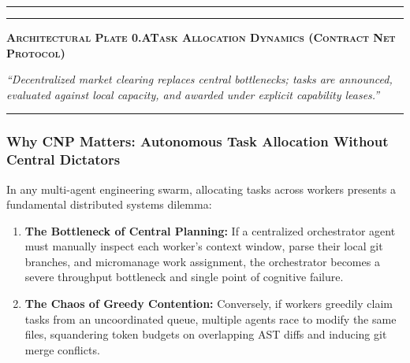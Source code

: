\vspace{10pt}
\noindent\begin{minipage}{\linewidth}
  \centering
  \par\vspace{8pt}%
  {\color{pdcobalt}\rule{\linewidth}{1.2pt}}\par\vspace{5pt}%
  \raggedright
  {\color{pdswissred}\rule{4.5pt}{4.5pt}}\enspace%
  {\pdgrotesk\bfseries\scshape\fontsize{9}{11}\selectfont\color{hhink}%
    Architectural Plate 0.A\enspace\textperiodcentered\enspace Task Allocation Dynamics (Contract Net Protocol)}\par\vspace{4pt}%
  {\pdgrotesk\itshape\fontsize{9.5}{13}\selectfont\color{hhink}%
    ``Decentralized market clearing replaces central bottlenecks; tasks are announced, evaluated against local capacity, and awarded under explicit capability leases.''}\par\vspace{6pt}%
  {\color{hhgray!30}\rule{\linewidth}{0.4pt}}
\end{minipage}
\vspace{10pt}

\subsubsection{Why CNP Matters: Autonomous Task Allocation Without Central Dictators}
\label{sec:why-cnp-matters}

In any multi-agent engineering swarm, allocating tasks across workers presents a fundamental distributed systems dilemma:
\begin{enumerate}[leftmargin=1.8em,itemsep=2pt]
  \item \textbf{The Bottleneck of Central Planning:} If a centralized orchestrator agent must manually inspect each worker's context window, parse their local git branches, and micromanage work assignment, the orchestrator becomes a severe throughput bottleneck and single point of cognitive failure.
  \item \textbf{The Chaos of Greedy Contention:} Conversely, if workers greedily claim tasks from an uncoordinated queue, multiple agents race to modify the same files, squandering token budgets on overlapping AST diffs and inducing git merge conflicts.
\end{enumerate}


